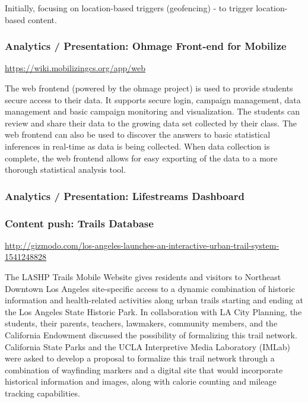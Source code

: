 Initially, focusing on location-based triggers (geofencing) - to trigger location-based content.

\subsubsection{Analytics / Presentation: Ohmage Front-end for Mobilize}

\url{https://wiki.mobilizingcs.org/app/web}

The web frontend (powered by the ohmage project) is used to provide students secure access to their data. It supports secure login, campaign management, data management and basic campaign monitoring and visualization. The students can review and share their data to the growing data set collected by their class. The web frontend can also be used to discover the answers to basic statistical inferences in real-time as data is being collected. When data collection is complete, the web frontend allows for easy exporting of the data to a more thorough statistical analysis tool. 

\subsubsection{Analytics / Presentation: Lifestreams Dashboard}

\cite{hsieh2013acm}

\subsubsection{Content push: Trails Database}

\url{http://gizmodo.com/los-angeles-launches-an-interactive-urban-trail-system-1541248828}

The LASHP Trails Mobile Website gives residents and visitors to Northeast Downtown Los Angeles site-specific access to a dynamic combination of historic information and health-related activities along urban trails starting and ending at the Los Angeles State Historic Park. In collaboration with LA City Planning, the students, their parents, teachers, lawmakers, community members, and the California Endowment discussed the possibility of formalizing this trail network. California State Parks and the UCLA Interpretive Media Laboratory (IMLab) were asked to develop a proposal to formalize this trail network through a combination of wayfinding markers and a digital site that would incorporate historical information and images, along with calorie counting and mileage tracking capabilities.


